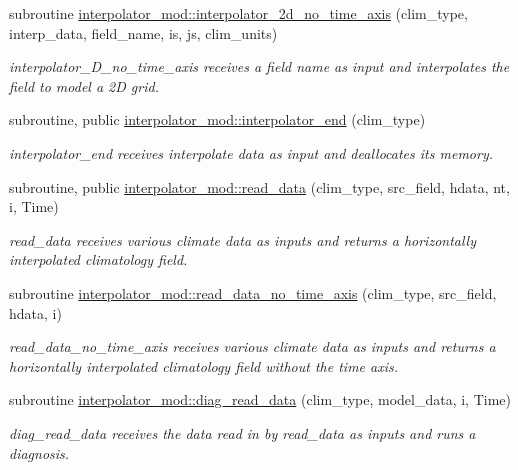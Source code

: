\begin{DoxyCompactItemize}
subroutine \hyperlink{namespaceinterpolator__mod_a0085bbfdd9a3d3d9d267f3e9f93b52e7}{interpolator\+\_\+mod\+::interpolator\+\_\+2d\+\_\+no\+\_\+time\+\_\+axis} (clim\+\_\+type, interp\+\_\+data, field\+\_\+name, is, js, clim\+\_\+units)
\begin{DoxyCompactList}\small\item\em interpolator\+\_\+D\+\_\+no\+\_\+time\+\_\+axis receives a field name as input and interpolates the field to model a 2D grid. \end{DoxyCompactList}\item 
subroutine, public \hyperlink{namespaceinterpolator__mod_a7e435e7e9e550fb380f88f362501faa1}{interpolator\+\_\+mod\+::interpolator\+\_\+end} (clim\+\_\+type)
\begin{DoxyCompactList}\small\item\em interpolator\+\_\+end receives interpolate data as input and deallocates its memory. \end{DoxyCompactList}\item 
subroutine, public \hyperlink{namespaceinterpolator__mod_ac433f8a3533f768e90b7c1bcfc7864f7}{interpolator\+\_\+mod\+::read\+\_\+data} (clim\+\_\+type, src\+\_\+field, hdata, nt, i, Time)
\begin{DoxyCompactList}\small\item\em read\+\_\+data receives various climate data as inputs and returns a horizontally interpolated climatology field. \end{DoxyCompactList}\item 
subroutine \hyperlink{namespaceinterpolator__mod_a8ecd87ad4db593537031aa0fbcf22805}{interpolator\+\_\+mod\+::read\+\_\+data\+\_\+no\+\_\+time\+\_\+axis} (clim\+\_\+type, src\+\_\+field, hdata, i)
\begin{DoxyCompactList}\small\item\em read\+\_\+data\+\_\+no\+\_\+time\+\_\+axis receives various climate data as inputs and returns a horizontally interpolated climatology field without the time axis. \end{DoxyCompactList}\item 
subroutine \hyperlink{namespaceinterpolator__mod_a1c8291f5d841abbe9cee8901503a806c}{interpolator\+\_\+mod\+::diag\+\_\+read\+\_\+data} (clim\+\_\+type, model\+\_\+data, i, Time)
\begin{DoxyCompactList}\small\item\em diag\+\_\+read\+\_\+data receives the data read in by read\+\_\+data as inputs and runs a diagnosis. \end{DoxyCompactList}\item 

\end{DoxyCompactItemize}
